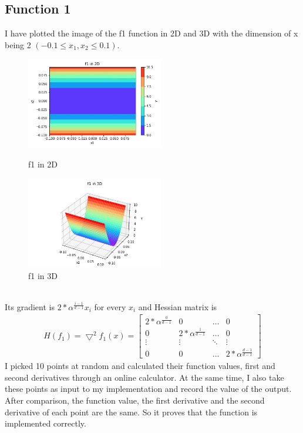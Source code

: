 \documentclass[a4paper,12pt]{article}
\begin{document}
\subsection{Function 1}
I have plotted the image of the f1 function in 2D and 3D with the dimension of x being 2 $(-0.1 \leq x_1, x_2 \leq 0.1)$.\\
\begin{figure}[htbp]
\centering
\begin{minipage}[t]{0.48\textwidth}
\centering
\includegraphics[width=6cm]{f1_2d.jpg}
\caption{f1 in 2D}
\end{minipage}
\begin{minipage}[t]{0.48\textwidth}
\centering
\includegraphics[width=6cm]{f1_3d.jpg}
\caption{f1 in 3D}
\end{minipage}
\end{figure}\\
Its gradient is $2*\alpha^{\frac{i-1}{d-1}}x_i$ for every $x_i$ and Hessian matrix is 
\begin{align*}
H(f_1) = \bigtriangledown^2 f_1(x) = 
\begin{bmatrix}
2*\alpha^{\frac{0}{d-1}} & 0 & \hdots & 0\\
0 & 2*\alpha^{\frac{1}{d-1}} & \hdots & 0 \\
\vdots & \vdots & \ddots & \vdots \\ 
0 & 0 & \hdots & 2*\alpha^{\frac{d-1}{d-1}}
\end{bmatrix}
\end{align*}
I picked 10 points at random and calculated their function values, first and second derivatives through an online calculator. At the same time, I also take these points as input to my implementation and record the value of the output. After comparison, the function value, the first derivative and the second  derivative of each point are the same. So it proves that the function is implemented correctly.
\end{document}
